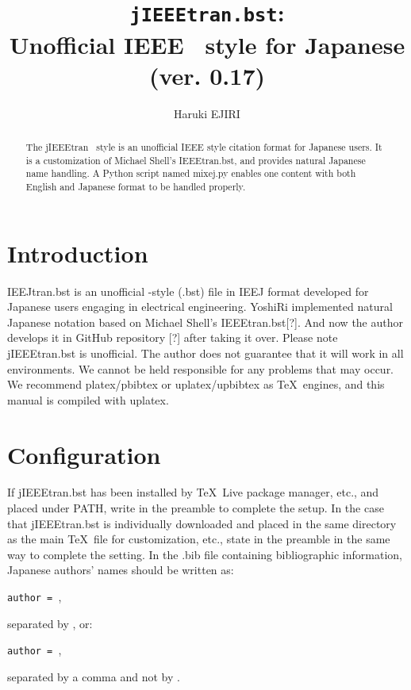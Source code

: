 \documentclass[11pt, a4paper, dvipdfmx]{article}
\title{\texttt{jIEEEtran.bst}:\\Unofficial IEEE \BibTeX\ style for Japanese\\(ver. 0.17)}
\author{Haruki EJIRI}
\begin{document}
\maketitle

\begin{abstract}
The jIEEEtran \BibTeX\ style is an unofficial IEEE style citation format for Japanese users.
It is a customization of Michael Shell's IEEEtran.bst, and provides natural Japanese name handling.
A Python script named mixej.py enables one content with both English and Japanese format to be handled properly.
\end{abstract}


\section{Introduction}

IEEJtran.bst is an unofficial \BibTeX-style (.bst) file in IEEJ format developed for Japanese users engaging in electrical engineering.
YoshiRi implemented natural Japanese notation based on Michael Shell's IEEEtran.bst[?].
And now the author develops it in GitHub repository [?] after taking it over.
Please note jIEEEtran.bst is unofficial.
The author does not guarantee that it will work in all environments.
We cannot be held responsible for any problems that may occur.
We recommend platex/pbibtex or uplatex/upbibtex as \TeX\ engines, and this manual is compiled with uplatex.


\section{Configuration}

If jIEEEtran.bst has been installed by \TeX\ Live package manager, etc., and placed under PATH, write  in the preamble to complete the setup.
In the case that jIEEEtran.bst is individually downloaded and placed in the same directory as the main \TeX\ file for customization, etc., state  in the preamble in the same way to complete the setting.
In the .bib file containing bibliographic information, Japanese authors' names should be written as:
\begin{center}
\texttt{author = },
\end{center}
separated by \texttt{\string{\string}}, or:
\begin{center}
\texttt{author = },
\end{center}
separated by a comma and not by \texttt{\string{\string}}.
\end{document}

